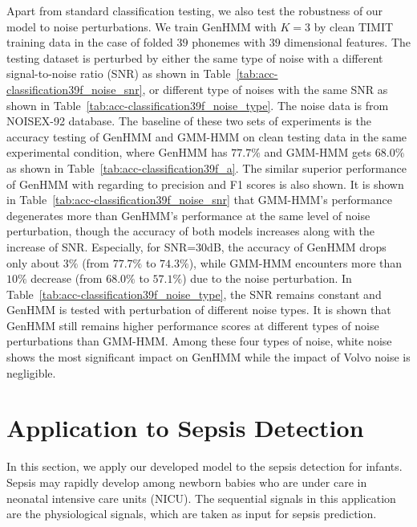 Apart from standard classification testing, we also test the robustness of our model to noise perturbations. We train GenHMM with $K=3$ by clean TIMIT training data in the case of folded $39$ phonemes with $39$ dimensional features. The testing dataset is perturbed by either the same type of noise with a different signal-to-noise ratio (SNR) as shown in Table~\ref{tab:acc-classification39f_noise_snr}, or different type of noises with the same SNR as shown in Table~\ref{tab:acc-classification39f_noise_type}. The noise data is from NOISEX-92 database. The baseline of these two sets of experiments is the accuracy testing of GenHMM and GMM-HMM on clean testing data in the same experimental condition, where GenHMM has $77.7\%$ and GMM-HMM gets $68.0\%$ as shown in Table~\ref{tab:acc-classification39f_a}. The similar superior performance of GenHMM with regarding to precision and F1 scores is also shown. It is shown in Table~\ref{tab:acc-classification39f_noise_snr} that GMM-HMM's performance degenerates more than GenHMM's performance at the same level of noise perturbation, though the accuracy of both models increases along with the increase of SNR. Especially, for SNR=$30$dB, the accuracy of GenHMM drops only about $3\%$ (from $77.7\%$ to $74.3\%$), while GMM-HMM encounters more than $10\%$ decrease (from $68.0\%$ to $57.1\%$) due to the noise perturbation. In Table~\ref{tab:acc-classification39f_noise_type}, the SNR remains constant and GenHMM is tested with perturbation of different noise types. It is shown that GenHMM still remains higher performance scores at different types of noise perturbations than GMM-HMM. Among these four types of noise, white noise shows the most significant impact on GenHMM while the impact of Volvo noise is negligible.


\section{Application to Sepsis Detection}\label{chpt7:sec:app-sepsis}
In this section, we apply our developed model to the sepsis detection for infants. Sepsis may rapidly develop among newborn babies who are under care in neonatal intensive care units (NICU). The sequential signals in this application are the physiological signals, which are taken as input for
sepsis prediction.

